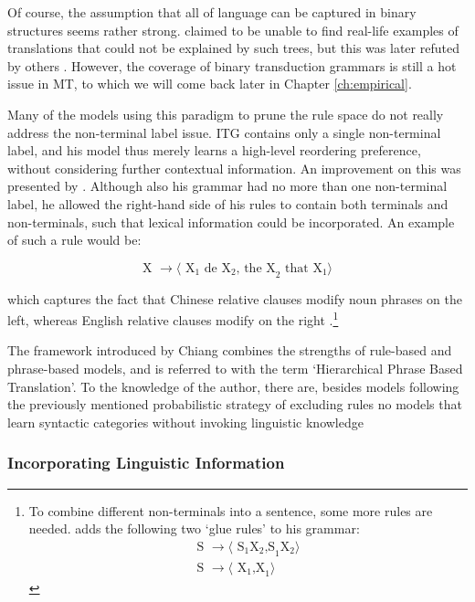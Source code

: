 Of course, the assumption that all of language can be captured in binary structures seems rather strong. \citeauthor{wu1997stochastic} claimed to be unable to find real-life examples of translations that could not be explained by such trees, but this was later refuted by others \citep[e.g.,][]{galley2004s}. However, the coverage of binary transduction grammars is still a hot issue in MT, to which we will come back later in Chapter \ref{ch:empirical}. 

Many of the models using this paradigm to prune the rule space do not really address the non-terminal label issue.  ITG contains only a single non-terminal label, and his model thus merely learns a high-level reordering preference, without considering further contextual information. An improvement on this was presented by \cite{chiang2005hierarchical,chiang2007hierarchical}. Although also his grammar had no more than one non-terminal label, he allowed the right-hand side of his rules to contain both terminals and non-terminals, such that lexical information could be incorporated. An example of such a rule would be:

\[
\text{X } \rightarrow \langle\text{ X}_1 \text{ de X}_2 \text{, the X}_2 \text{ that X}_1\rangle
\]

\noindent which captures the fact that Chinese relative clauses modify noun phrases on the left, whereas English relative clauses modify on the right \citep{chiang2007hierarchical}.\footnote{To combine different non-terminals into a sentence, some more rules are needed. \cite{chiang2007hierarchical} adds the following two `glue rules' to his grammar:\begin{align*}
 \text{S } \rightarrow \langle\text{ S}_1\text{X}_2 \text{,S}_1\text{X}_2\rangle\\
\text{S } \rightarrow \langle\text{ X}_1 \text{,X}_1\rangle 
\end{align*}

}

The framework introduced by Chiang combines the strengths of rule-based and phrase-based models, and is referred to with the term `Hierarchical Phrase Based Translation'. To the knowledge of the author, there are, besides models following the previously mentioned probabilistic strategy of excluding rules \citep[e.g.,]{mylonakis2010learning,blunsom2008bayesian} no models that learn syntactic categories without invoking linguistic knowledge


\subsubsection{Incorporating Linguistic Information}

